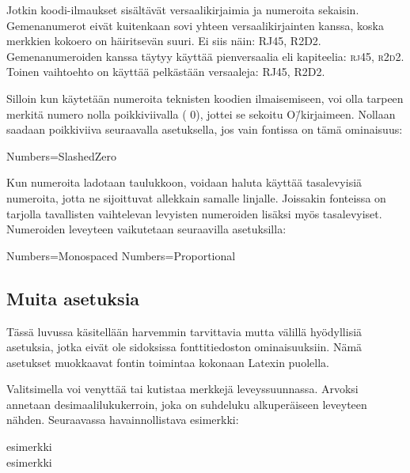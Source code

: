Jotkin koodi-ilmaukset sisältävät versaalikirjaimia ja numeroita
sekaisin. Gemenanumerot eivät kuitenkaan sovi yhteen versaalikirjainten
kanssa, koska merkkien koko\-ero on häiritsevän suuri. Ei siis näin:
RJ45, R2D2. Gemenanumeroiden kanssa täytyy käyttää pienversaalia eli
kapiteelia: \textsc{rj45}, \textsc{r2d2}. Toinen vaihtoehto on käyttää
pelkästään versaaleja: {\versaalinum RJ45, R2D2}.

Silloin kun käytetään numeroita teknisten koodien ilmaisemiseen, voi
olla tarpeen merkitä numero nolla poikkiviivalla
({ 0}), jottei se
sekoitu O\=/kirjaimeen. Nollaan saadaan poikkiviiva seuraavalla
asetuksella, jos vain fontissa on tämä ominaisuus:

\begin{koodilohkosis}
  Numbers=SlashedZero
\end{koodilohkosis}

Kun numeroita ladotaan taulukkoon, voidaan haluta käyttää tasalevyisiä
numeroita, jotta ne sijoittuvat allekkain samalle linjalle. Joissakin
fonteissa on tarjolla tavallisten vaihtelevan levyisten numeroiden
lisäksi myös tasalevyiset. Numeroiden leveyteen vaikutetaan seuraavilla
asetuksilla:

\begin{koodilohkosis}
  Numbers=Monospaced   %
  Numbers=Proportional %
\end{koodilohkosis}

\subsection{Muita asetuksia}
\label{luku:fontit_muut}

Tässä luvussa käsitellään harvemmin tarvittavia mutta välillä
hyödyllisiä asetuksia, jotka eivät ole sidoksissa fonttitiedoston
ominaisuuksiin. Nämä asetukset muokkaavat fontin toimintaa kokonaan
Latexin puolella.

Valitsimella%
  voi venyttää tai
kutistaa merkkejä leveyssuunnassa. Arvoksi annetaan
desimaalilukukerroin, joka on suhdeluku alkuperäiseen leveyteen nähden.
Seuraavassa havainnollistava esimerkki:

\begin{koodilohkosis}
  esimerkki \\
  { esimerkki}
\end{koodilohkosis}

